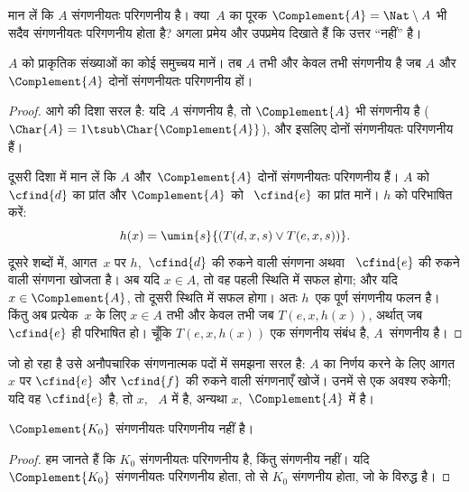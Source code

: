 \documentclass[../../../include/open-logic-section]{subfiles}
\begin{document}

मान लें कि $A$ संगणनीयतः परिगणनीय है। क्या~$A$ का पूरक
$\Complement{A} = \Nat \setminus A$ भी सदैव संगणनीयतः परिगणनीय होता है?
अगला प्रमेय और उपप्रमेय दिखाते हैं कि उत्तर ``नहीं'' है।

\begin{thm}
$A$ को प्राकृतिक संख्याओं का कोई समुच्चय मानें। तब $A$ तभी और केवल तभी
संगणनीय है जब $A$ और $\Complement{A}$ दोनों संगणनीयतः परिगणनीय हों।
\end{thm}

\begin{proof}
आगे की दिशा सरल है: यदि $A$ संगणनीय है, तो $\Complement{A}$ भी संगणनीय
है ($\Char{A} = 1 \tsub
\Char{\Complement{A}}$), और इसलिए दोनों
संगणनीयतः परिगणनीय हैं।

दूसरी दिशा में मान लें कि $A$ और~$\Complement{A}$ दोनों संगणनीयतः
परिगणनीय हैं। $A$ को~$\cfind{d}$ का प्रांत और $\Complement{A}$ को
~$\cfind{e}$ का प्रांत मानें। $h$ को परिभाषित करें:
\[
h(x) = \umin{s}{(T(d,x,s) \lor T(e,x,s))}.
\]
दूसरे शब्दों में, आगत~$x$ पर $h$,~$\cfind{d}$ की रुकने वाली संगणना अथवा
~$\cfind{e}$ की रुकने वाली संगणना खोजता है। अब यदि $x \in A$, तो वह
पहली स्थिति में सफल होगा; और यदि $x \in
\Complement{A}$, तो दूसरी स्थिति
में सफल होगा। अतः $h$~एक पूर्ण संगणनीय फलन है। किंतु अब प्रत्येक~$x$ के
लिए $x \in
A$ तभी और केवल तभी जब $T(e, x, h(x))$, अर्थात् जब
$\cfind{e}$ ही परिभाषित हो। चूँकि $T(e, x, h(x))$ एक संगणनीय संबंध है,
$A$~संगणनीय है।
\end{proof}

\begin{explain}
जो हो रहा है उसे अनौपचारिक संगणनात्मक पदों में समझना सरल है: $A$ का
निर्णय करने के लिए आगत $x$ पर $\cfind{e}$ और $\cfind{f}$ की रुकने वाली
संगणनाएँ खोजें। उनमें से एक अवश्य रुकेगी; यदि वह $\cfind{e}$ है, तो $x$,
~$A$ में है, अन्यथा $x$,~$\Complement{A}$ में है।
\end{explain}

\begin{cor}
$\Complement{K_0}$ संगणनीयतः परिगणनीय नहीं है।
\end{cor}

\begin{proof}
हम जानते हैं कि $K_0$ संगणनीयतः परिगणनीय है, किंतु संगणनीय नहीं। यदि
$\Complement{K_0}$ संगणनीयतः परिगणनीय होता, तो  से
$K_0$ संगणनीय होता, जो  के विरुद्ध है।
\end{proof}
\end{document}
